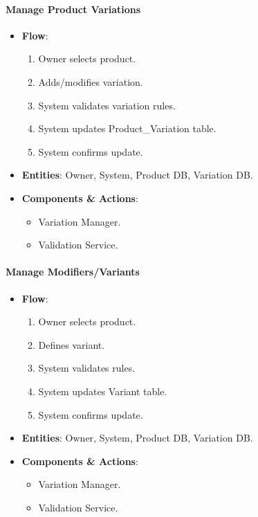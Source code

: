\documentclass[]{VUMIFTemplateClass}
\begin{document}
\paragraph{Manage Product Variations}

\begin{itemize}
    \item \textbf{Flow}: \begin{enumerate}
    \item Owner selects product.
    \item Adds/modifies variation.
    \item System validates variation rules.
    \item System updates Product\_Variation table.
    \item System confirms update.
    \end{enumerate}
    \item \textbf{Entities}: Owner, System, Product DB, Variation DB.
    \item \textbf{Components \& Actions}: \begin{itemize}
        \item Variation Manager.
        \item Validation Service.
    \end{itemize}
\end{itemize}

\paragraph{Manage Modifiers/Variants}

\begin{itemize}
    \item \textbf{Flow}: \begin{enumerate}
    \item Owner selects product.
    \item Defines variant.
    \item System validates rules.
    \item System updates Variant table.
    \item System confirms update.
    \end{enumerate}
    \item \textbf{Entities}: Owner, System, Product DB, Variation DB.
    \item \textbf{Components \& Actions}: \begin{itemize}
        \item Variation Manager.
        \item Validation Service.
    \end{itemize}
\end{itemize}
\end{document}
